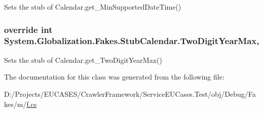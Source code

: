 Sets the stub of Calendar.\-get\-\_\-\-Min\-Supported\-Date\-Time()

\hypertarget{class_system_1_1_globalization_1_1_fakes_1_1_stub_calendar_a7a91c28e91cb8174870b99c49d525f52}{
\subsubsection[{Two\-Digit\-Year\-Max}]{\setlength{\rightskip}{0pt plus 5cm}override int System.\-Globalization.\-Fakes.\-Stub\-Calendar.\-Two\-Digit\-Year\-Max\hspace{0.3cm}{\ttfamily [get]}, {\ttfamily [set]}}}\label{class_system_1_1_globalization_1_1_fakes_1_1_stub_calendar_a7a91c28e91cb8174870b99c49d525f52}


Sets the stub of Calendar.\-get\-\_\-\-Two\-Digit\-Year\-Max()



The documentation for this class was generated from the following file\-:\begin{DoxyCompactItemize}
\item 
D\-:/\-Projects/\-E\-U\-C\-A\-S\-E\-S/\-Crawler\-Framework/\-Service\-E\-U\-Cases.\-Test/obj/\-Debug/\-Fakes/m/\hyperlink{m_2f_8cs}{f.\-cs}\end{DoxyCompactItemize}

